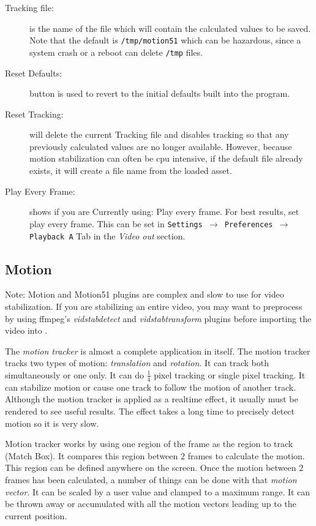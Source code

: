 \begin{description}
    \item[Tracking file:] is the name of the file which will contain the calculated values to be saved. Note that the default is \texttt{/tmp/motion51} which can be hazardous, since a system crash or a reboot can delete \texttt{/tmp} files.
    \item[Reset Defaults:] button is used to revert to the initial defaults built into the program.
    \item[Reset Tracking:] will delete the current Tracking file and disables tracking so that any previously calculated values are no longer available. However, because motion stabilization can often be cpu intensive, if the default file already exists, it will create a file name from the loaded asset.
    \item[Play Every Frame:] shows if you are Currently using: Play every frame. For best results, set play every frame. This can be set in \texttt{Settings $\rightarrow$ Preferences $\rightarrow$ Playback A} Tab in the \textit{Video out} section.
\end{description}

\subsection{Motion}%
\label{sub:motion}

Note: Motion and Motion51 plugins are complex and slow to use for video stabilization. If you are stabilizing an entire video, you may want to preprocess by using ffmpeg's \textit{vidstabdetect} and \textit{vidstabtransform} plugins before importing the video into \CGG{}.

The \textit{motion tracker} is almost a complete application in itself. The motion tracker tracks two types of motion: \textit{translation} and \textit{rotation}. It can track both simultaneously or one only. It can do $\frac{1}{4}$ pixel tracking or single pixel tracking. It can stabilize motion or cause one track to follow the motion of another track. Although the motion tracker is applied as a realtime effect, it usually must be rendered to see useful results. The effect takes a long time to precisely detect motion so it is very slow.

Motion tracker works by using one region of the frame as the region to track (Match Box). It compares this region between $2$ frames to calculate the motion. This region can be defined anywhere on the screen. Once the motion between $2$ frames has been calculated, a number of things can be done with that \textit{motion vector}. It can be scaled by a user value and clamped to a maximum range. It can be thrown away or accumulated with all the motion vectors leading up to the current position.

